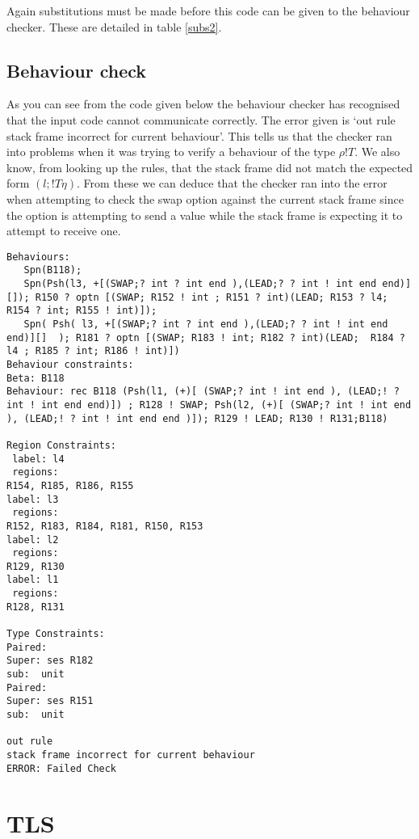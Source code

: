 Again substitutions must be made before this code can be given to the behaviour checker. These are detailed in table \ref{subs2}.


\subsection{Behaviour check}

As you can see from the code given below the behaviour checker has recognised that the input code cannot communicate correctly. The error given is `out rule stack frame incorrect for current behaviour'. This tells us that the checker ran into problems when it was trying to verify a behaviour of the type $\rho!T$. We also know, from looking up the rules, that the stack frame did not match the expected form $(l; !T\eta)$. From these we can deduce that the checker ran into the error when attempting to check the swap option against the current stack frame since the option is attempting to send a value while the stack frame is expecting it to attempt to receive one. 

\begin{lstlisting}
Behaviours:
   Spn(B118);
   Spn(Psh(l3, +[(SWAP;? int ? int end ),(LEAD;? ? int ! int end end)][]); R150 ? optn [(SWAP; R152 ! int ; R151 ? int)(LEAD; R153 ? l4; R154 ? int; R155 ! int)]);  
   Spn( Psh( l3, +[(SWAP;? int ? int end ),(LEAD;? ? int ! int end end)][]  ); R181 ? optn [(SWAP; R183 ! int; R182 ? int)(LEAD;  R184 ? l4 ; R185 ? int; R186 ! int)])
Behaviour constraints:
Beta: B118 
Behaviour: rec B118 (Psh(l1, (+)[ (SWAP;? int ! int end ), (LEAD;! ? int ! int end end)]) ; R128 ! SWAP; Psh(l2, (+)[ (SWAP;? int ! int end ), (LEAD;! ? int ! int end end )]); R129 ! LEAD; R130 ! R131;B118)

Region Constraints:
 label: l4
 regions:
R154, R185, R186, R155
label: l3
 regions:
R152, R183, R184, R181, R150, R153
label: l2
 regions:
R129, R130
label: l1
 regions:
R128, R131

Type Constraints:
Paired: 
Super: ses R182 
sub:  unit 
Paired: 
Super: ses R151
sub:  unit 

out rule
stack frame incorrect for current behaviour
ERROR: Failed Check
\end{lstlisting}

\FloatBarrier
\section{TLS}
\label{tlsexampsec}

